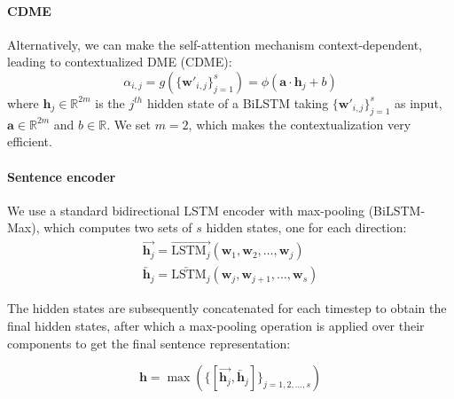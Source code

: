\documentclass[11pt,a4paper]{article}
\begin{document}
\paragraph{CDME}

Alternatively, we can make the self-attention mechanism context-dependent, leading to contextualized DME (CDME):
\begin{equation}
\label{eq:cdme}
\alpha_{i,j}=g(\{\mathbf{w'}_{i,j}\}_{j=1}^{s})=\phi(\mathbf{a}\cdot\mathbf{h}_{j} + b)
\end{equation}
where $\mathbf{h}_{j}\in\mathbb{R}^{2m}$ is the $j^{th}$ hidden state of a BiLSTM taking $\{\mathbf{w'}_{i,j}\}_{j=1}^{s}$ as input, $\mathbf{a}\in\mathbb{R}^{2m}$ and $b\in\mathbb{R}$. We set $m=2$, which makes the contextualization very efficient.

\paragraph{Sentence encoder}

We use a standard bidirectional LSTM encoder with max-pooling (BiLSTM-Max), which computes two sets of $s$ hidden states, one for each direction:
\begin{align*}
\overrightarrow{\mathbf{h}_j} = \overrightarrow{\text{LSTM}_j}(\mathbf{w}_{1}, \mathbf{w}_{2}, \ldots, \mathbf{w}_{j})\\
\overleftarrow{\mathbf{h}_j} = \overleftarrow{\text{LSTM}}_j(\mathbf{w}_{j}, \mathbf{w}_{j+1}, \ldots, \mathbf{w}_{s})
\end{align*}

\noindent The hidden states are subsequently concatenated for each timestep to obtain the final hidden states, after which a max-pooling operation is applied over their components to get the final sentence representation:

\[
\mathbf{h} = \max(\{[\overrightarrow{\mathbf{h}_j}, \overleftarrow{\mathbf{h}_j}]\}_{j=1, 2, \ldots, s})
\]
\end{document}
